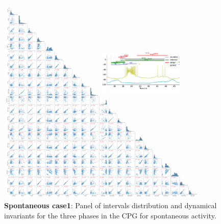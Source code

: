 \begin{figure}[htbp]
	\centering
	\includegraphics[width=0.9\textwidth]{./invariants/data/SUSSEX/prep1/images/3phases/panel_with_pairplot.pdf}
	\caption{\textbf{Spontaneous case1}: Panel of intervals distribution and dynamical invariants for the three phases in the CPG for spontaneous activity.}
	\label{fig:prep1 invariants pairplot}
\end{figure}


